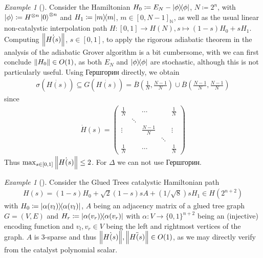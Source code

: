 \documentclass[10pt]{amsart}
\theoremstyle{definition}
\theoremstyle{remark}
\newtheorem{example}[theorem]{Example}
\begin{document}
    \begin{example}[{\cite[p. 10]{Albash}}]
        Consider the Hamiltonian \(H_0 \coloneqq E_N - \ketbra{\phi}{\phi}\), \(N \coloneqq 2^n\), with \(\ket{\phi} \coloneqq H^{\otimes n}\ket{0}^{\otimes n}\) and \(H_1 \coloneqq \ketbra{m}{m}\), \(m \in [0, N-1]_{\mathbb{N}}\), as well as the usual linear non-catalystic interpolation path \(H\colon [0, 1] \to H(N), s \mapsto (1-s)H_0+sH_1\). Computing \(\norm{\dot{H(s)}}\), \(s \in [0, 1]\), to apply the rigorous adiabatic theorem in the analysis of the adiabatic Grover algorithm is a bit cumbersome, with  we can first conclude \(\norm{H_0} \in O(1)\), as both \(E_N\) and \(\ketbra{\phi}{\phi}\) are stochastic, although this is not particularly useful. Using Гершгорин directly, we obtain
        \begin{align}
            \sigma(\dot{H(s)}) \subseteq G(\dot{H(s)}) = \overline{B}\left(\frac{1}{N}, \frac{N-1}{N}\right) \cup \overline{B}\left(\frac{N-1}{N}, \frac{N-1}{N}\right)
        \end{align}
        since
        \begin{align}
            \dot{H}(s) = \begin{pmatrix}
                \frac{1}{N} & & \cdots &      & \frac{1}{N}\\
                            & \ddots & &      &\\
                \vdots      & & \frac{N-1}{N} & & \vdots\\
                            & & & \ddots      &\\
                \frac{1}{N} & & \cdots &      & \frac{1}{N}
            \end{pmatrix}
        \end{align}
        Thus \(\max_{s \in [0, 1]} \norm{\dot{H(s)}} \leq 2\). For \(\Delta\) we can not use Гершгорин.
    \end{example}

    \begin{example}[{\cite[p. 2]{Nagaj}}]
        Consider the Glued Trees catalystic Hamiltonian path
        \begin{align}
            H(s) = (1-s) H_0 + \sqrt{2} (1-s)sA + (1/\sqrt{8}) s H_1 \in H(2^{n+2})
        \end{align}
        with \(H_0 \coloneqq \ketbra{\alpha(v_l)}{\alpha(v_l)}\), \(A\) being an adjacency matrix of a glued tree graph \(G = (V, E)\) and \(H_r \coloneqq \ketbra{\alpha(v_r)}{\alpha(v_r)}\) with \(\alpha\colon V \to \{0, 1\}^{n+2}\) being an (injective) encoding function and \(v_l, v_r \in V\) being the left and rightmost vertices of the graph. \(A\) is \(3\)-sparse and thus \(\norm{\dot{H(s)}}, \norm{\ddot{H(s)}} \in O(1)\), as we may directly verify from the catalyst polynomial scalar.
    \end{example}
\end{document}
